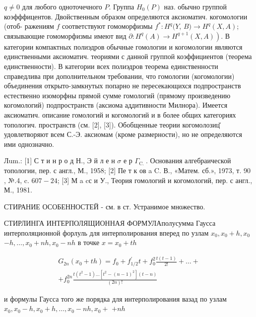 \documentclass[10pt]{article}
\begin{document}
$q \neq 0$ для любого одноточечного $P$. Группа $H_{0}(P)$ наз. обычно группой коэфффицентов. Двойственным образом определяются аксиоматич. когомологии (отоб- ражениям $f$ соответствуют гомоморфизмы $f^{*}: H^{q}(Y$, $B) \rightarrow H^{q}(X, A)$; связывающие гомоморфизмы имеют вид $\left.\partial: H^{q}(A) \rightarrow H^{q+1}(X, A)\right)$. В категории компактных полиэдров обычные гомологии и когомологии являются единственными аксиоматич. теориями с данной группой коэффициентов (теорема единственности). В категории всех полиэдров теорема единственности справедлива при дополнительном требовании, что гомологии (когомологии) объединения открыто-замкнутых попарно не пересекающихся подпространств естественно изоморфны прямой сумме гомологий (прямому произведению когомологий) подпространств (аксиома аддитивности Милнора). Имеется аксиоматич. описание гомологий и когомологий и в более общих категориях топологич. пространств (см. [2], [3]). Обобщенные теории когомолозиц̆ удовлетворяют всем С.-Э. аксиомам (кроме размерности), но не определяются ими однозначно.



Лum.: [1] С т и н р о д Н., Э й л е н $\sigma$ е р $\Gamma_{\text {C. }}$. Основания алгебраической топологии, пер. с англ., М., 1958; [2] Пе т к ов a C. В., «Матем. сб.», 1973, т. 90 , №.4, c. $607-24$; [3] М a cс и У., Теория гомологий и когомологий, пер. с англ., М., 1981.



СТИРАНИЕ ОСОБЕННОСТЕЙ - см. в ст. Устранимое множество.



СТИРЛИНГА ИНТЕРПОЛЯЩИОННАЯ ФОРМУЛАполусумма Гаусса интерполяционной форлуль для интерполирования вперед по узлам $x_{0}, x_{0}+h, x_{0}$ $-h, \ldots, x_{0}+n h, x_{0}-n h$ в точке $x=x_{0}+t h$



\[

\begin{gathered}

G_{2 n}\left(x_{0}+t h\right)=f_{0}+f_{1 / 2}^{\prime} t+f_{0}^{2} \frac{t(t-1)}{2 !}+\ldots+ \\

+f_{0}^{2 n} \frac{t\left(t^{2}-1\right) \ldots\left[t^{2}-(n-1)^{2}\right](t-n)}{(2 n) !}

\end{gathered}

\]



и формулы Гаусса того же порядка для интерполирования вазад по узлам $x_{0}, x_{0}-h, x_{0}+h, \ldots, x_{0}-n h, x_{0}+$ $+n h$
\end{document}
